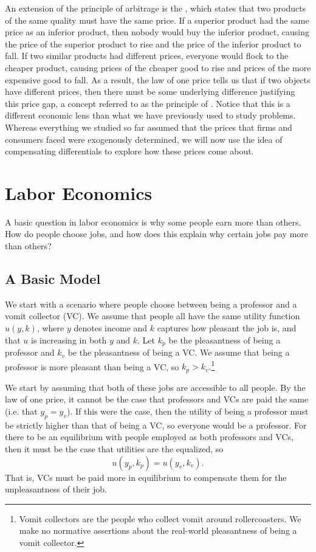 An extension of the principle of arbitrage is the , which states that two products of the same quality must have the same price. If a superior product had the same price as an inferior product, then nobody would buy the inferior product, causing the price of the superior product to rise and the price of the inferior product to fall. If two similar products had different prices, everyone would flock to the cheaper product, causing prices of the cheaper good to rise and prices of the more expensive good to fall. As a result, the law of one price tells us that if two objects have different prices, then there must be some underlying difference justifying this price gap, a concept referred to as the principle of . Notice that this is a different economic lens than what we have previously used to study problems. Whereas everything we studied so far assumed that the prices that firms and consumers faced were exogenously determined, we will now use the idea of compensating differentials to explore how these prices come about.

\section{Labor Economics}

A basic question in labor economics is why some people earn more than others. How do people choose jobs, and how does this explain why certain jobs pay more than others?

\subsection*{A Basic Model} 
We start with a scenario where people choose between being a professor and a vomit collector (VC). We assume that people all have the same utility function $u(y, k)$, where $y$ denotes income and $k$ captures how pleasant the job is, and that $u$ is increasing in both $y$ and $k$. Let $k_p$ be the pleasantness of being a professor and $k_v$ be the pleasantness of being a VC. We assume that being a professor is more pleasant than being a VC, so $k_p > k_v.$\footnote{Vomit collectors are the people who collect vomit around rollercoasters. We make no normative assertions about the real-world pleasantness of being a vomit collector.}

We start by assuming that both of these jobs are accessible to all people. By the law of one price, it cannot be the case that professors and VCs are paid the same (i.e. that $y_p = y_v$). If this were the case, then the utility of being a professor must be strictly higher than that of being a VC, so everyone would be a professor. For there to be an equilibrium with people employed as both professors and VCs, then it must be the case that utilities are the equalized, so 
$$u(y_p, k_p) = u(y_v, k_v).$$
That is, VCs must be paid more in equilibrium to compensate them for the unpleasantness of their job.

